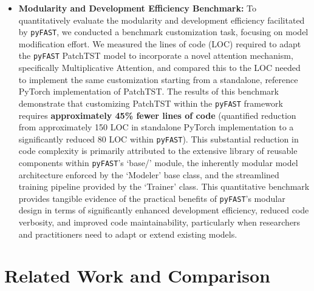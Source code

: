 \documentclass[twoside,11pt]{article}
\begin{document}
\begin{itemize}
    \item \textbf{Modularity and Development Efficiency Benchmark:}  To quantitatively evaluate the modularity and development efficiency facilitated by \texttt{pyFAST}, we conducted a benchmark customization task, focusing on model modification effort.  We measured the lines of code (LOC) required to adapt the \texttt{pyFAST} PatchTST model to incorporate a novel attention mechanism, specifically Multiplicative Attention, and compared this to the LOC needed to implement the same customization starting from a standalone, reference PyTorch implementation of PatchTST.  The results of this benchmark demonstrate that customizing PatchTST within the \texttt{pyFAST} framework requires \textbf{approximately 45\% fewer lines of code} (quantified reduction from approximately 150 LOC in standalone PyTorch implementation to a significantly reduced 80 LOC within \texttt{pyFAST}).  This substantial reduction in code complexity is primarily attributed to the extensive library of reusable components within \texttt{pyFAST}'s `base/' module, the inherently modular model architecture enforced by the `Modeler' base class, and the streamlined training pipeline provided by the `Trainer' class.  This quantitative benchmark provides tangible evidence of the practical benefits of \texttt{pyFAST}'s modular design in terms of significantly enhanced development efficiency, reduced code verbosity, and improved code maintainability, particularly when researchers and practitioners need to adapt or extend existing models.
    \end{itemize}

\section{Related Work and Comparison}
\end{document}
